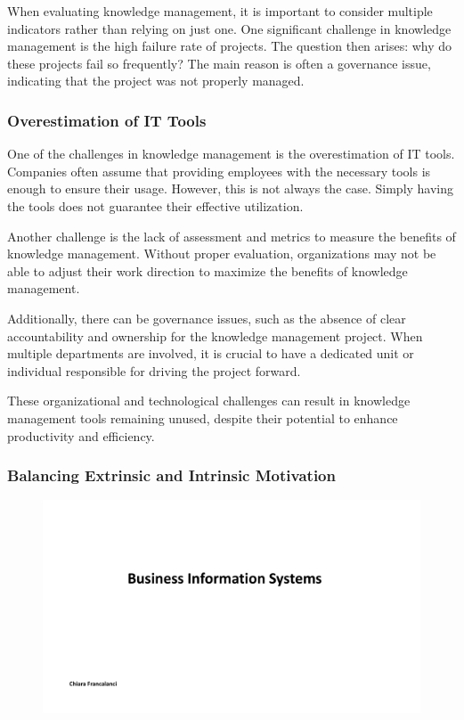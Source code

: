 When evaluating knowledge management, it is important to consider
multiple indicators rather than relying on just one. One significant
challenge in knowledge management is the high failure rate of projects.
The question then arises: why do these projects fail so frequently? The
main reason is often a governance issue, indicating that the project was
not properly managed.

\subsubsection{Overestimation of IT
    Tools}\label{overestimation-of-it-tools}

One of the challenges in knowledge management is the overestimation of
IT tools. Companies often assume that providing employees with the
necessary tools is enough to ensure their usage. However, this is not
always the case. Simply having the tools does not guarantee their
effective utilization.

Another challenge is the lack of assessment and metrics to measure the
benefits of knowledge management. Without proper evaluation,
organizations may not be able to adjust their work direction to maximize
the benefits of knowledge management.

Additionally, there can be governance issues, such as the absence of
clear accountability and ownership for the knowledge management project.
When multiple departments are involved, it is crucial to have a
dedicated unit or individual responsible for driving the project
forward.

These organizational and technological challenges can result in
knowledge management tools remaining unused, despite their potential to
enhance productivity and efficiency.

\subsubsection{Balancing Extrinsic and Intrinsic
    Motivation}\label{balancing-extrinsic-and-intrinsic-motivation}

\begin{figure}[!h]
    \centering
    \includegraphics[page=19, trim = 1.5cm 3.6cm 1.5cm 3cm, clip, width=\textwidth]{images/05 - KM.pdf}
\end{figure}

